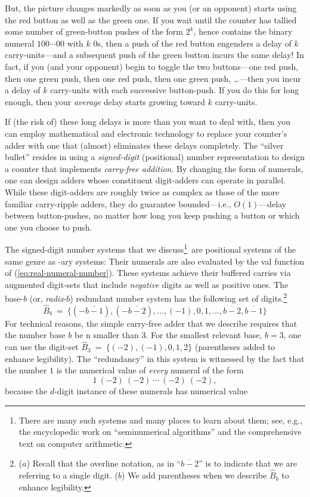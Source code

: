 But, the picture changes markedly as soon as you (or an opponent)
starts using the red button as well as the green one.  If you wait
until the counter has tallied some number of green-button pushes of
the form $2^k$, hence contains the binary numeral $100 \cdots 00$ with
$k$ $0$s, then a push of the red button engenders a delay of $k$
carry-units---and a subsequent push of the green button incurs the
same delay!  In fact, if you (and your opponent) begin to toggle the
two buttons---one red push, then one green push, then one red push,
then one green push, \ldots---then you incur a delay of $k$
carry-units with each successive button-push.  If you do this for long
enough, then your {\em average} delay starts growing toward $k$
carry-units.

If (the risk of) these long delays is more than you want to deal with,
then you can employ mathematical and electronic technology to replace
your counter's adder with one that (almost) eliminates these delays
completely.  The ``silver bullet'' resides in using a {\em
  signed-digit} (positional) number representation
to design a counter that implements {\it carry-free addition}.
 By changing the form of numerals, one can
design adders whose constituent digit-adders can operate in parallel.
While these digit-adders are roughly twice as complex as those of the
more familiar carry-ripple adders, they do guarantee bounded---i.e.,
$O(1)$---delay between button-pushes, no matter how long you keep
pushing a button or which one you choose to push.

The signed-digit number systems that we discuss\footnote{There are
  many such systems and many places to learn about them; see, e.g.,
  the encyclopedic work \cite{Knuth69} on ``seminumerical algorithms''
  and the comprehensive text \cite{Hwang79} on computer
  arithmetic.}~are positional systems of the same genre as -ary
systems: Their numerals are also evaluated by the {\sc val} function
of (\ref{eq:real-numeral-number}).  These systems achieve their
buffered carries via augmented digit-sets that include {\em negative}
digits as well as positive ones.  The base-$b$ (or, {\it radix}-$b$)
redundant number system 
 has the following set of
digits.\footnote{($a$) Recall that the overline notation, as in
  ``$\overline{b-2}$'' is to indicate that we are referring to a
  single digit.  ($b$) We add parentheses when we describe
  $\widehat{B}_b$ to enhance legibility.}
\[ \widehat{B}_b \ = \ \{(-\overline{b-1}), (-\overline{b-2}), \ldots,
(-1), 0 , 1, \ldots, \overline{b-2}, \overline{b-1}\}
\]
For technical reasons, the simple carry-free adder that we describe
requires that the number base $b$ be n smaller than $3$.  For the
smallest relevant base, $b=3$, one can use the digit-set
$\widehat{B}_3 \ = \ \{ (-2), (-1), 0, 1, 2\}$ (parentheses added to
enhance legibility).  The ``redundancy'' in this system is witnessed
by the fact that the number $1$ is the numerical value of {\em every}
numeral of the form
\[ 1 \ (-2) \ (-2) \ \cdots \ (-2) \ (-2), \]
because the $d$-digit instance of these numerals has numerical value

